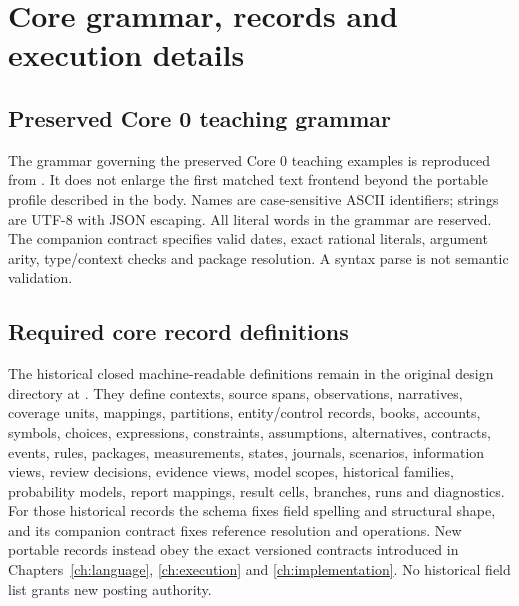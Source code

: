 \chapter{Core grammar, records and execution details}
\label{app:contracts}

\section{Preserved Core 0 teaching grammar}

The grammar governing the preserved Core 0 teaching examples is reproduced
from . It does not enlarge the first matched text
frontend beyond the portable profile described in the body. Names are
case-sensitive ASCII identifiers; strings are UTF-8 with JSON escaping. All
literal words in the grammar are reserved. The companion contract specifies
valid dates, exact rational literals, argument arity, type/context checks and
package resolution. A syntax parse is not semantic validation.



\section{Required core record definitions}

The historical closed machine-readable definitions remain in the original
design directory at . They define contexts, source spans,
observations, narratives, coverage units, mappings, partitions, entity/control
records, books, accounts, symbols, choices, expressions, constraints, assumptions,
alternatives, contracts, events, rules, packages, measurements, states,
journals, scenarios, information views, review decisions, evidence views,
model scopes, historical families, probability models, report mappings,
result cells, branches, runs and diagnostics. For those historical records the schema fixes field spelling and structural
shape, and its companion contract fixes reference resolution and operations.
New portable records instead obey the exact versioned contracts introduced in
Chapters~\ref{ch:language}, \ref{ch:execution} and \ref{ch:implementation}.
No historical field list grants new posting authority.

